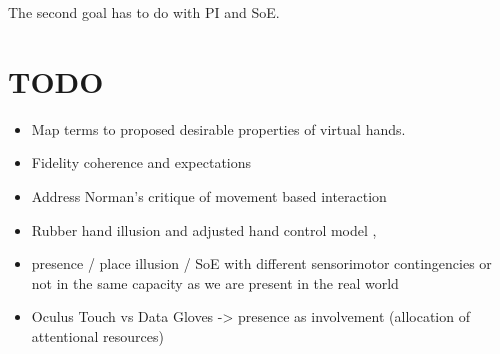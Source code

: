 The second goal has to do with PI and SoE.

\section{TODO}

\begin{itemize}
\item Map terms to proposed desirable properties of virtual hands.
\item Fidelity coherence and expectations \parencite{Nowak2003, Argelaguet2016}
\item Address Norman's critique of movement based interaction \parencite{Gillies2016}
\item Rubber hand illusion and adjusted hand control model \parencite{Sanchez-Vives2010}, \parencite{Fourneret1998}
\item presence / place illusion / SoE with different sensorimotor contingencies or not in the same capacity as we are present in the real world
\item Oculus Touch vs Data Gloves -> presence as involvement (allocation of attentional resources)
\end{itemize}
